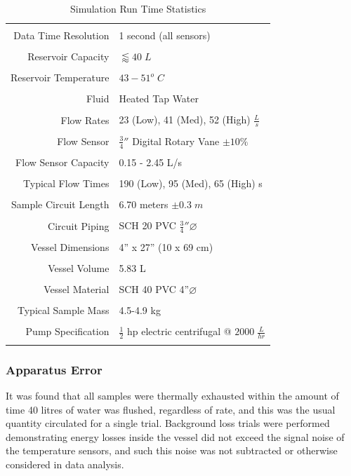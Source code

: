 \begin{table}[t!]
\caption{Simulation Run Time Statistics}
\label{runTime}
\centering
\begin{tabular}{r l}
\hline
\hline
\\[-.5ex]
Data Time Resolution    & 1 second (all sensors)\\
\\
Reservoir Capacity	& $\lessapprox 40\;L$\\
\\
Reservoir Temperature 	& $43-51^{o}\;C$\\
\\
Fluid 			& Heated Tap Water\\
\\
Flow Rates		& 23 (Low), 41 (Med), 52 (High) $\frac{L}{s}$\\
\\
Flow Sensor		& $\frac{3}{4}''$ Digital Rotary Vane $\pm10\%$\\
\\
Flow Sensor Capacity	& 0.15 - 2.45 L/s\\
\\
Typical Flow Times	& 190 (Low), 95 (Med), 65 (High) s\\
\\
Sample Circuit Length	& 6.70 meters $\pm0.3\;m$\\
\\
Circuit Piping		& SCH 20 PVC $\frac{3}{4}''\varnothing$\\
\\
Vessel Dimensions	& 4'' x 27'' (10 x 69 cm)\\
\\
Vessel Volume		& 5.83 L\\
\\
Vessel Material		& SCH 40 PVC 4''$\varnothing$\\
\\
Typical Sample Mass	& 4.5-4.9 kg\\
\\
Pump Specification	& $\frac{1}{2}$ hp electric centrifugal @ $2000\;\frac{L}{hr}$\\
\\
\hline
\end{tabular}
\end{table} 

\subsubsection*{Apparatus Error}
It was found that all samples were thermally exhausted within the amount of time 40 litres of water was flushed, regardless of rate, and this was the usual quantity circulated for a single trial. Background loss trials were performed demonstrating energy losses inside the vessel did not exceed the signal noise of the temperature sensors, and such this noise was not subtracted or otherwise considered in data analysis.

